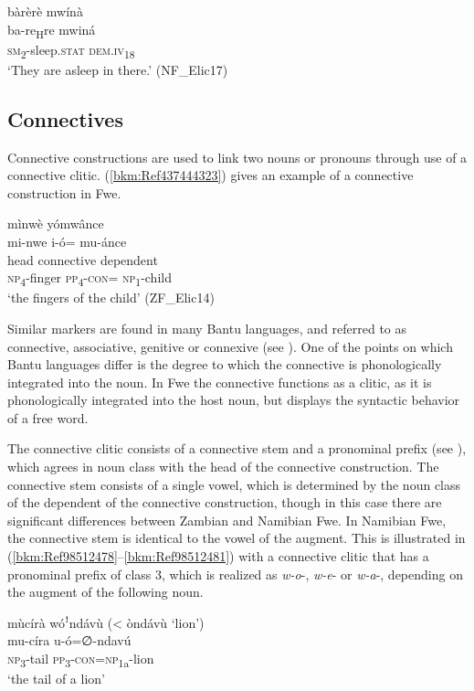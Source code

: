 \ea
\label{bkm:Ref99548185}
bàrèrè mwínà\\
\gll ba-re\textsubscript{H}re    mwiná\\
\textsc{sm}\textsubscript{2}-sleep.\textsc{stat}  \textsc{dem}.\textsc{iv}\textsubscript{18}\\
\glt ‘They are asleep in there.’ (NF\_Elic17)
\z
\subsection{Connectives}
\label{bkm:Ref492133177}\hypertarget{Toc75352648}{}\label{bkm:Ref492133189}
Connective constructions are used to link two nouns or pronouns through use of a connective clitic. (\ref{bkm:Ref437444323}) gives an example of a connective construction in Fwe.

\ea
\label{bkm:Ref437444323}
mìnwè yómwânce\\
\glll mi-nwe  i-ó=    mu-ánce\\
head    connective  dependent\\
\textsc{np}\textsubscript{4}-finger  \textsc{pp}\textsubscript{4}-\textsc{con}=  \textsc{np}\textsubscript{1}-child\\
\glt ‘the fingers of the child’ (ZF\_Elic14)
\z

Similar markers are found in many Bantu languages, and referred to as connective, associative, genitive or connexive (see \citealt{Velde2013}). One of the points on which Bantu languages differ is the degree to which the connective is phonologically integrated into the noun. In Fwe the connective functions as a clitic, as it is phonologically integrated into the host noun, but displays the syntactic behavior of a free word.

The connective clitic consists of a connective stem and a pronominal prefix (see ), which agrees in noun class with the head of the connective construction. The connective stem consists of a single vowel, which is determined by the noun class of the dependent of the connective construction, though in this case there are significant differences between Zambian and Namibian Fwe. In Namibian Fwe, the connective stem is identical to the vowel of the augment. This is illustrated in (\ref{bkm:Ref98512478}--\ref{bkm:Ref98512481}) with a connective clitic that has a pronominal prefix of class 3, which is realized as \textit{w-o}-, \textit{w-e}- or \textit{w-a}-, depending on the augment of the following noun.

\ea
\label{bkm:Ref98512478}
mùcírà wóꜝndávù (< òndávù ‘lion’)\\
\gll mu-círa  u-ó=∅-ndavú\\
\textsc{np}\textsubscript{3}-tail  \textsc{pp}\textsubscript{3}-\textsc{con}=\textsc{np}\textsubscript{1a}-lion\\
\glt ‘the tail of a lion’
\z

